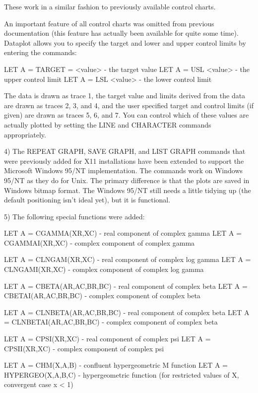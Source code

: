 {    These work in a similar fashion to previously available control charts.

    An important feature of all control charts was omitted from previous
    documentation (this feature has actually been available for quite some time).
    Dataplot allows you to specify the target and lower and upper
    control limits by entering the commands:

       LET A = TARGET = <value>       - the target value
       LET A = USL <value>            - the upper control limit
       LET A = LSL <value>            - the lower control limit

    The data is drawn as trace 1, the target value and limits derived from the
    data are drawn as traces 2, 3, and 4, and the user specified target and
    control limits (if given) are drawn as traces 5, 6, and 7.  You can control
    which of these values are actually plotted by setting the LINE and CHARACTER
    commands appropriately.

 4) The REPEAT GRAPH, SAVE GRAPH, and LIST GRAPH commands that were previously
    added for X11 installations have been extended to support the Microsoft
    Windows 95/NT implementation.  The commands work on Windows 95/NT as they
    do for Unix.  The primary difference is that the plots are saved in
    Windows bitmap format.  The Windows 95/NT still needs a little tidying up
    (the default positioning isn't ideal yet), but it is functional.

 5) The following special functions were added:

     LET A = CGAMMA(XR,XC)     - real component of complex gamma
     LET A = CGAMMAI(XR,XC)    - complex component of complex gamma

     LET A = CLNGAM(XR,XC)     - real component of complex log gamma
     LET A = CLNGAMI(XR,XC)    - complex component of complex log gamma

     LET A = CBETA(AR,AC,BR,BC)  - real component of complex beta
     LET A = CBETAI(AR,AC,BR,BC) - complex component of complex beta

     LET A = CLNBETA(AR,AC,BR,BC)  - real component of complex beta
     LET A = CLNBETAI(AR,AC,BR,BC) - complex component of complex beta

     LET A = CPSI(XR,XC)       - real component of complex psi
     LET A = CPSII(XR,XC)      - complex component of complex psi

     LET A = CHM(X,A,B)        - confluent hypergeometric M function
     LET A = HYPERGEO(X,A,B,C) - hypergeometric function (for restricted values of X,
                                 convergent case x < 1)

}
